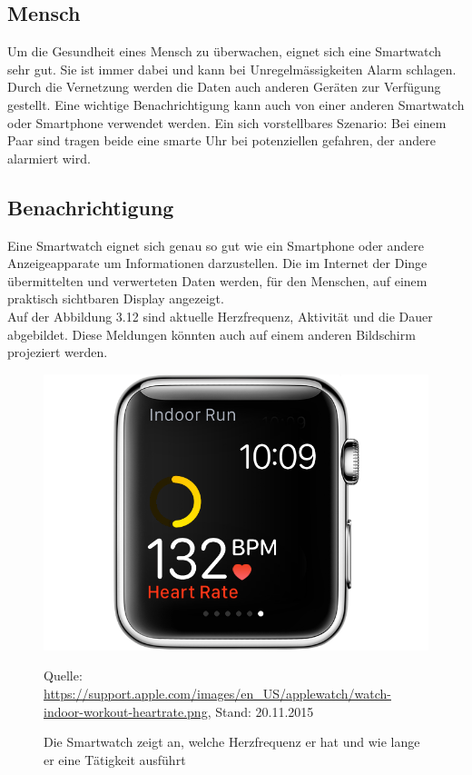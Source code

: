 \subsection{Mensch}
Um die Gesundheit eines Mensch zu überwachen, eignet sich eine Smartwatch sehr gut. Sie ist immer dabei und kann bei Unregelmässigkeiten Alarm schlagen. Durch die Vernetzung werden die Daten auch anderen Geräten zur Verfügung gestellt. Eine wichtige Benachrichtigung kann auch von einer anderen Smartwatch oder Smartphone verwendet werden. Ein sich vorstellbares Szenario: Bei einem Paar sind tragen beide eine smarte Uhr bei potenziellen gefahren, der andere alarmiert wird.

\subsection{Benachrichtigung}
Eine Smartwatch eignet sich genau so gut wie ein Smartphone oder andere Anzeigeapparate um Informationen darzustellen. Die im Internet der Dinge übermittelten und verwerteten Daten werden, für den Menschen, auf einem praktisch sichtbaren Display angezeigt.\\
Auf der Abbildung 3.12 sind aktuelle Herzfrequenz, Aktivität und die Dauer abgebildet. Diese Meldungen könnten auch auf einem anderen Bildschirm projeziert werden.
\begin{figure}[H]
  \centering
  \includegraphics[scale=1]{98_Bilder/03_Marktsegmente/infodisplay}
  \caption[Smartwatch Anzeige von Tätigkeiten]{Die Smartwatch zeigt an, welche Herzfrequenz er hat und wie lange er eine Tätigkeit ausführt}
  \footnotesize Quelle: \url{https://support.apple.com/images/en_US/applewatch/watch-indoor-workout-heartrate.png}, Stand: 20.11.2015
\end{figure}

